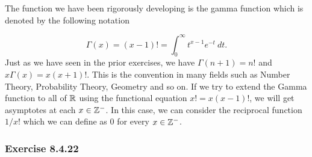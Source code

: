 The function we have been rigorously developing is the gamma function which is denoted by the following notation

\[  \Gamma(x) = (x-1)! = \int_{ 0 }^{ \infty  }  t^{x-1} e^{-t } \ dt. \] 
Just as we have seen in the prior exercises, we have \( \Gamma(n+1) = n!   \) and \( x\Gamma(x) = x(x+1)! \). This is the convention in many fields such as Number Theory, Probability Theory, Geometry and so on.
If we try to extend the Gamma function to all of \( \mathbb{R}  \) using the functional equation \(  x! = x (x-1)! \), we will get asymptotes at each \( x \in  \mathbb{Z}^{-} \). In this case, we can consider the reciprocal function \( 1 / x!  \) which we can define as \( 0  \) for every \( x \in \mathbb{Z}^{- } \).

\subsubsection{Exercise 8.4.22}
